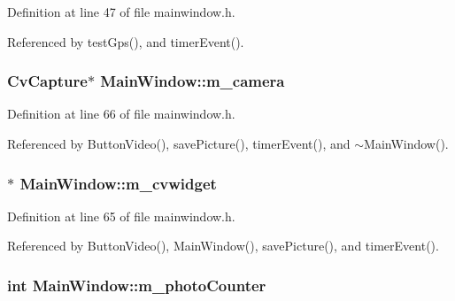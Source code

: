 Definition at line 47 of file mainwindow.\-h.



Referenced by test\-Gps(), and timer\-Event().

\hypertarget{classMainWindow_a1e4ee7611df9ee764de50cd2bfdebc55}{
\subsubsection[{m\-\_\-camera}]{\setlength{\rightskip}{0pt plus 5cm}Cv\-Capture$\ast$ Main\-Window\-::m\-\_\-camera\hspace{0.3cm}{\ttfamily [private]}}}\label{classMainWindow_a1e4ee7611df9ee764de50cd2bfdebc55}


Definition at line 66 of file mainwindow.\-h.



Referenced by Button\-Video(), save\-Picture(), timer\-Event(), and $\sim$\-Main\-Window().

\hypertarget{classMainWindow_a3225ace47a46792151d14646b6429712}{
\subsubsection[{m\-\_\-cvwidget}]{$\ast$ Main\-Window\-::m\-\_\-cvwidget\hspace{0.3cm}{\ttfamily [private]}}}\label{classMainWindow_a3225ace47a46792151d14646b6429712}


Definition at line 65 of file mainwindow.\-h.



Referenced by Button\-Video(), Main\-Window(), save\-Picture(), and timer\-Event().

\hypertarget{classMainWindow_a264802533d4b55dce30d220ba9559471}{
\subsubsection[{m\-\_\-photo\-Counter}]{\setlength{\rightskip}{0pt plus 5cm}int Main\-Window\-::m\-\_\-photo\-Counter\hspace{0.3cm}{\ttfamily [private]}}}\label{classMainWindow_a264802533d4b55dce30d220ba9559471}


